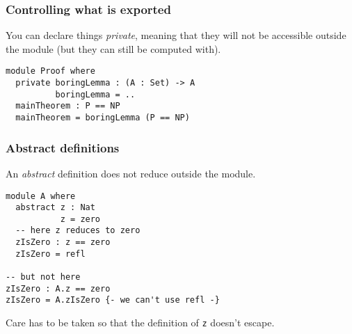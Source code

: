 \documentclass{beamer}
\newenvironment{agda}{
\begin{block}{}\small
}{
\end{block}
}
\begin{document}

\begin{frame}[fragile]
\frametitle{Controlling what is exported}
You can declare things {\em private}, meaning that they will not be
accessible outside the module (but they can still be computed with).

\begin{agda}
\begin{verbatim}
module Proof where
  private boringLemma : (A : Set) -> A
          boringLemma = ..
  mainTheorem : P == NP
  mainTheorem = boringLemma (P == NP)
\end{verbatim}
\end{agda}

\end{frame}


\begin{frame}[fragile]
  \frametitle{Abstract definitions}

  An {\em abstract} definition does not reduce outside the module.
\begin{agda}
\begin{verbatim}
module A where
  abstract z : Nat
           z = zero
  -- here z reduces to zero
  zIsZero : z == zero
  zIsZero = refl

-- but not here
zIsZero : A.z == zero
zIsZero = A.zIsZero {- we can't use refl -}
\end{verbatim}
\end{agda}

  Care has to be taken so that the definition of \verb!z! doesn't escape.

\end{frame}

\end{document}
